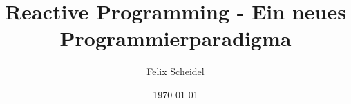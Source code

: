 \documentclass[a4paper,12pt,headsepline]{book}
\title{Reactive Programming - Ein neues Programmierparadigma}
\author{Felix Scheidel}
\date{\today}
\begin{document}

 
 
 
 
 	
 
\tableofcontents %

\pagestyle{plain} %



	

		
	
	
	



	
	
\listoffigures

\listoftables

\renewcommand{\lstlistlistingname}{Listingverzeichnis}
\lstlistoflistings
	
\end{document}
